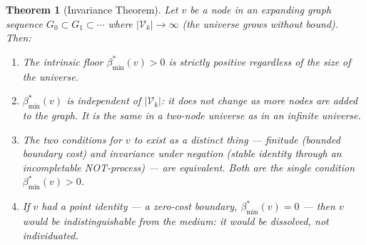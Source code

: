 \documentclass[11pt,twocolumn,a4paper]{article}
\theoremstyle{plain}
\newtheorem{theorem}{Theorem}[section]
\theoremstyle{definition}
\theoremstyle{remark}
\newcommand{\Vcal}{\mathcal{V}}
\newcommand{\bmin}{\beta_{\min}}
\begin{document}
\begin{theorem}[Invariance Theorem]
\label{thm:invariance}
Let $v$ be a node in an expanding graph sequence $G_0 \subset G_1 \subset
\cdots$ where $|\Vcal_k| \to \infty$ (the universe grows without bound). Then:

\begin{enumerate}[label=(\roman*)]
  \item The intrinsic floor $\bmin^*(v) > 0$ is strictly positive regardless
  of the size of the universe.

  \item $\bmin^*(v)$ is independent of $|\Vcal_k|$: it does not change as
  more nodes are added to the graph. It is the same in a two-node universe
  as in an infinite universe.

  \item The two conditions for $v$ to exist as a distinct thing --- finitude
  (bounded boundary cost) and invariance under negation (stable identity
  through an incompletable NOT-process) --- are equivalent. Both are the
  single condition $\bmin^*(v) > 0$.

  \item If $v$ had a point identity --- a zero-cost boundary, $\bmin^*(v) = 0$
  --- then $v$ would be indistinguishable from the medium: it would be
  dissolved, not individuated.
\end{enumerate}
\end{theorem}
\end{document}
